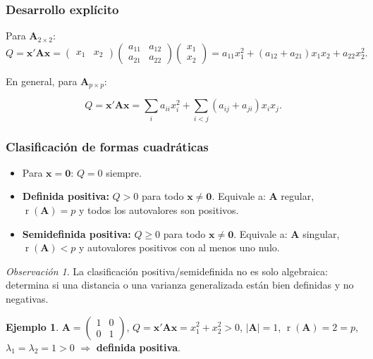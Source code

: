 \documentclass[12pt, a4paper]{article}
\theoremstyle{plain}
\theoremstyle{definition}
\newtheorem{ejemplo}{Ejemplo}[section]
\theoremstyle{remark}
\newtheorem*{observacion}{Observación}
\newcommand{\mat}[1]{\mathbf{#1}}
\newcommand{\rg}{\operatorname{r}}
\begin{document}
\subsubsection{Desarrollo explícito}

Para $\mat{A}_{2\times2}$:
\[
  Q = \mathbf{x}'\mat{A}\mathbf{x}
  = \begin{pmatrix}x_1&x_2\end{pmatrix}
    \begin{pmatrix}a_{11}&a_{12}\\a_{21}&a_{22}\end{pmatrix}
    \begin{pmatrix}x_1\\x_2\end{pmatrix}
  = a_{11}x_1^2 + (a_{12}+a_{21})x_1x_2 + a_{22}x_2^2.
\]

En general, para $\mat{A}_{p\times p}$:
\begin{mdframed}[style=resultado]
\[
  Q = \mathbf{x}'\mat{A}\mathbf{x} = \sum_i a_{ii}x_i^2 + \sum_{i<j}(a_{ij}+a_{ji})x_ix_j.
\]
\end{mdframed}

\subsubsection{Clasificación de formas cuadráticas}

\begin{mdframed}[style=resultado]
\begin{itemize}
  \item Para $\mathbf{x}=\mathbf{0}$: $Q=0$ siempre.
  \item \textbf{Definida positiva:} $Q>0$ para todo $\mathbf{x}\neq\mathbf{0}$.
        Equivale a: $\mat{A}$ regular, $\rg(\mat{A})=p$ y todos los autovalores
        son positivos.
  \item \textbf{Semidefinida positiva:} $Q\ge0$ para todo $\mathbf{x}\neq\mathbf{0}$.
        Equivale a: $\mat{A}$ singular, $\rg(\mat{A})<p$ y autovalores
        positivos con al menos uno nulo.
\end{itemize}
\end{mdframed}

\begin{observacion}
La clasificación positiva/semidefinida no es solo algebraica: determina si una
distancia o una varianza generalizada están bien definidas y no negativas.
\end{observacion}

\begin{ejemplo}
$\mat{A}=\begin{pmatrix}1&0\\0&1\end{pmatrix}$,
$Q=\mathbf{x}'\mat{A}\mathbf{x}=x_1^2+x_2^2>0$,
$|\mat{A}|=1$, $\rg(\mat{A})=2=p$,
$\lambda_1=\lambda_2=1>0$ $\Rightarrow$ \textbf{definida positiva}.
\end{ejemplo}
\end{document}
